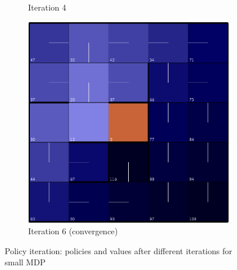 \documentclass[letterpaper]{article}
\begin{document}
\begin{figure}
\begin{subfigure}{.3\textwidth}
			\caption{Iteration 4}
		\end{subfigure}
		\begin{subfigure}{.3\textwidth}
			\centering
			\includegraphics[width=\linewidth]{images/small_pi_6}
			\caption{Iteration 6 (convergence)}
		\end{subfigure}
		\caption{Policy iteration: policies and values after different iterations for small MDP}
		\label{fig:mdp-pi-iter-small}%
	\end{figure}%
\end{document}

